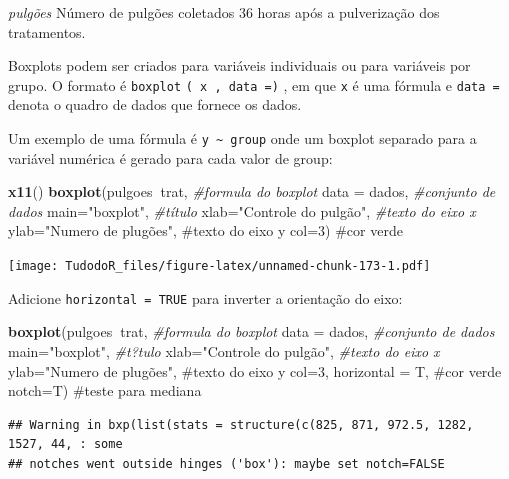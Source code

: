 \documentclass[
]{book}
\newenvironment{Shaded}{\begin{snugshade}}{\end{snugshade}}
\newcommand{\CommentTok}[1]{\textcolor[rgb]{0.56,0.35,0.01}{\textit{#1}}}
\newcommand{\DataTypeTok}[1]{\textcolor[rgb]{0.13,0.29,0.53}{#1}}
\newcommand{\KeywordTok}[1]{\textcolor[rgb]{0.13,0.29,0.53}{\textbf{#1}}}
\newcommand{\NormalTok}[1]{#1}
\newcommand{\OperatorTok}[1]{\textcolor[rgb]{0.81,0.36,0.00}{\textbf{#1}}}
\newcommand{\StringTok}[1]{\textcolor[rgb]{0.31,0.60,0.02}{#1}}
\begin{document}
\emph{pulgões}
Número de pulgões coletados 36 horas após a pulverização dos tratamentos.

Boxplots podem ser criados para variáveis individuais ou para variáveis por grupo. O formato é \texttt{boxplot} \texttt{(\ x\ ,\ data\ =)} , em que \texttt{x} é uma fórmula e \texttt{data\ =} denota o quadro de dados que fornece os dados.

Um exemplo de uma fórmula é \texttt{y\ \textasciitilde{}\ group} onde um boxplot separado para a variável numérica é gerado para cada valor de group:

\begin{Shaded}
\begin{Highlighting}[]
\KeywordTok{x11}\NormalTok{()}
\KeywordTok{boxplot}\NormalTok{(pulgoes}\OperatorTok{~}\NormalTok{trat,              }\CommentTok{#formula do boxplot}
        \DataTypeTok{data =}\NormalTok{ dados,              }\CommentTok{#conjunto de dados}
        \DataTypeTok{main=}\StringTok{"boxplot"}\NormalTok{,            }\CommentTok{#título}
        \DataTypeTok{xlab=}\StringTok{"Controle do pulgão"}\NormalTok{, }\CommentTok{#texto do eixo x }
        \DataTypeTok{ylab=}\StringTok{"Numero de plugões",  #texto do eixo y}
\StringTok{        col=3)                     #cor verde  }
\end{Highlighting}
\end{Shaded}

\texttt{[image: TudodoR\_files/figure-latex/unnamed-chunk-173-1.pdf]}

Adicione \texttt{horizontal\ =\ TRUE} para inverter a orientação do eixo:

\begin{Shaded}
\begin{Highlighting}[]
\KeywordTok{boxplot}\NormalTok{(pulgoes}\OperatorTok{~}\NormalTok{trat,              }\CommentTok{#formula do boxplot}
        \DataTypeTok{data =}\NormalTok{ dados,              }\CommentTok{#conjunto de dados}
        \DataTypeTok{main=}\StringTok{"boxplot"}\NormalTok{,            }\CommentTok{#t?tulo}
        \DataTypeTok{xlab=}\StringTok{"Controle do pulgão"}\NormalTok{, }\CommentTok{#texto do eixo x }
        \DataTypeTok{ylab=}\StringTok{"Numero de plugões",  #texto do eixo y}
\StringTok{        col=3, horizontal = T,     #cor verde  }
\StringTok{        notch=T)                   #teste para mediana}
\end{Highlighting}
\end{Shaded}

\begin{verbatim}
## Warning in bxp(list(stats = structure(c(825, 871, 972.5, 1282, 1527, 44, : some
## notches went outside hinges ('box'): maybe set notch=FALSE
\end{verbatim}
\end{document}
